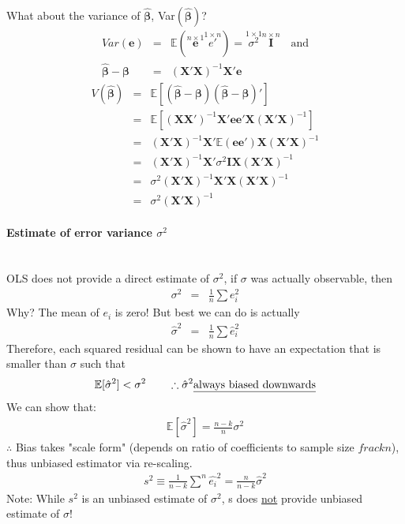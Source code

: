 \noindent What about the variance of $\boldsymbol{\hat{\beta}}$, Var$(\boldsymbol{\hat{\beta}})$?
\begin{eqnarray*}
Var(\boldsymbol{e}) &=& \mathbb{E}(\overset{n\times1}{\boldsymbol{e}}\overset{1\times n}{e'}) = \overset{1\times1}{\sigma^{2}}\overset{n\times n}{\boldsymbol{I}}\quad\text{and}\\
\boldsymbol{\hat{\beta}}-\boldsymbol{\beta} &=& (\boldsymbol{X'X})^{-1}\boldsymbol{X'e}
\end{eqnarray*}
\begin{eqnarray*}
V(\boldsymbol{\hat{\beta}}) &=& \mathbb{E}[(\boldsymbol{\hat{\beta}-\beta})(\boldsymbol{\hat{\beta}-\beta})']\\
&=& \mathbb{E}[(\boldsymbol{XX'})^{-1}\boldsymbol{X'ee'X}(\boldsymbol{X'X})^{-1}]\\
&=& (\boldsymbol{X'X})^{-1}\boldsymbol{X'}\mathbb{E}(\boldsymbol{ee'})\boldsymbol{X}(\boldsymbol{X'X})^{-1}\\
&=& (\boldsymbol{X'X})^{-1}\boldsymbol{X'}\sigma^{2}\boldsymbol{I}\boldsymbol{X}(\boldsymbol{X'X})^{-1}\\
&=& \sigma^{2}(\boldsymbol{X'X})^{-1}\boldsymbol{X'X}(\boldsymbol{X'X})^{-1}\\
&=& \sigma^{2}(\boldsymbol{X'X})^{-1}
\end{eqnarray*}
\paragraph{Estimate of error variance $\sigma^{2}$} ~\\
OLS does not provide a direct estimate of $\sigma^{2}$, if $\sigma$ was actually observable, then
\begin{eqnarray*}
\sigma^{2} &=& \frac{1}{n}\sum e^{2}_{i}
\end{eqnarray*}
Why? The mean of $e_i$ is zero!
But best we can do is actually
\begin{eqnarray*}
\hat{\sigma}^{2} &=& \frac{1}{n}\sum \hat{e}^{2}_{i}
\end{eqnarray*}
Therefore, each squared residual can be shown to have an expectation that is smaller than $\sigma$ such that
\begin{eqnarray*}
\mathbb{E}[\hat{\sigma}^{2}] < \sigma^{2}\qquad\therefore\hat{\sigma}^{2}\text{\underline{always biased downwards}}
\end{eqnarray*}
We can show that:
\begin{eqnarray*}
\mathbb{E}[\hat{\sigma}^{2}] = \frac{n-k}{n}\sigma^{2}
\end{eqnarray*}
$\therefore$ Bias takes "scale form" (depends on ratio of coefficients to sample size $frac{k}{n}$), thus unbiased estimator via re-scaling.
\begin{eqnarray*}
s^{2}\equiv\frac{1}{n-k}\sum^{n} \hat{e_{i}}^{2}=\frac{n}{n-k}\hat{\sigma}^{2}
\end{eqnarray*}
Note: While $s^{2}$ is an unbiased estimate of $\sigma^{2}$, s does \underline{not} provide unbiased estimate of $\sigma$!

